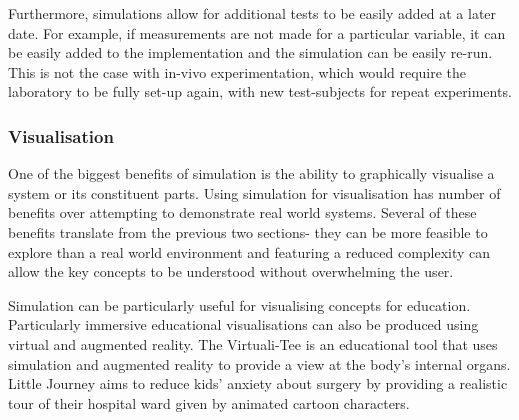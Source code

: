 \documentclass{UoYCSproject}
\begin{document}

Furthermore, simulations allow for additional tests to be easily added at a later date.
For example, if measurements are not made for a particular variable, it can be easily added to the implementation and the simulation can be easily re-run.
This is not the case with in-vivo experimentation, which would require the laboratory to be fully set-up again, with new test-subjects for repeat experiments.


\subsubsection{Visualisation}
\label{visualisation}
One of the biggest benefits of simulation is the ability to graphically visualise a system or its constituent parts.
Using simulation for visualisation has number of benefits over attempting to demonstrate real world systems.
Several of these benefits translate from the previous two sections- they can be more feasible to explore than a real world environment and featuring a reduced complexity can allow the key concepts to be understood without overwhelming the user.

Simulation can be particularly useful for visualising concepts for education. 
Particularly immersive educational visualisations can also be produced using virtual and augmented reality.
The Virtuali-Tee is an educational tool that uses simulation and augmented reality to provide a view at the body's internal organs\cite{curiscope}.
Little Journey aims to reduce kids' anxiety about surgery by providing a realistic tour of their hospital ward given by animated cartoon characters\cite{little_journey}.


\end{document}
